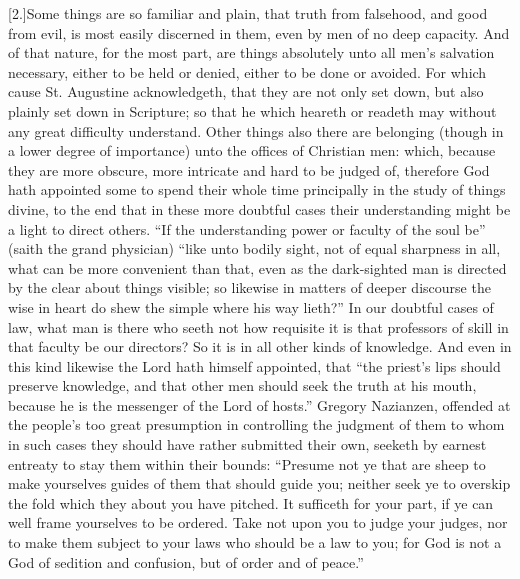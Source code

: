 [2.]Some things are so familiar and plain, that truth from falsehood, and good from evil, is most easily discerned in them, even by men of no deep capacity. And of that nature, for the most part, are things absolutely unto all men’s salvation necessary, either to be held or denied, either to be done or avoided. For which cause St. Augustine acknowledgeth, that they are not only set down, but also plainly set down in Scripture; so that he which heareth or readeth may without any great difficulty understand. Other things also there are belonging (though in a lower degree of importance) unto the offices of Christian men: which, because they are more obscure, more intricate and hard to be judged of, therefore God hath appointed some to spend their whole time principally in the study of things divine, to the end that in these more doubtful cases their understanding might be a light to direct others. “If the understanding power or faculty of the soul be” (saith the grand physician) “like unto bodily sight, not of equal sharpness in all, what can be more convenient than that, even as the dark-sighted man is directed by the clear about things visible; so likewise in matters of deeper discourse the wise in heart do shew the simple where his way lieth?” In our doubtful cases of law, what man is there who seeth not how requisite it is that professors of skill in that faculty be our directors? So it is in all other kinds of knowledge. And even in this kind likewise the Lord hath himself appointed, that “the priest’s lips should preserve knowledge, and that other men should seek the truth at his mouth, because he is the messenger of the Lord of hosts.” Gregory Nazianzen, offended at the people’s too great presumption in controlling the judgment of them to whom in such cases they should have rather submitted their own, seeketh by earnest entreaty to stay them within their bounds: “Presume not ye that are sheep to make yourselves guides of them that should guide you; neither seek ye to overskip the fold which they about you have pitched. It sufficeth for your part, if ye can well frame yourselves to be ordered. Take not upon you to judge your judges, nor to make them subject to your laws who should be a law to you; for God is not a God of sedition and confusion, but of order and of peace.”

